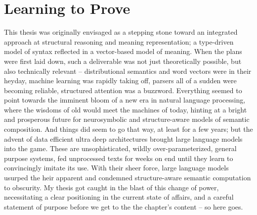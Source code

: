 \chapter{Learning to Prove}
\label{chapter:chapter_4}



This thesis was originally envisaged as a stepping stone toward an integrated approach at structural reasoning and meaning representation; a type-driven model of syntax reflected in a vector-based model of meaning.
When the plans were first laid down, such a deliverable was not just theoretically possible, but also technically relevant -- distributional semantics and word vectors were in their heyday, machine learning was rapidly taking off, parsers all of a sudden were becoming reliable, structured attention was a buzzword.
Everything seemed to point towards the imminent bloom of a new era in natural language processing, where the wisdoms of old would meet the machines of today, hinting at a bright and prosperous future for neurosymbolic and structure-aware models of semantic composition.
And things did seem to go that way, at least for a few years;
but the advent of data efficient ultra deep architectures brought large language models into the game.
These are unsophisticated, wildly over-parameterized, general purpose systems, fed unprocessed texts for weeks on end until they learn to convincingly imitate its use.
With their sheer force,
large language models usurped the heir apparent and condemned structure-aware semantic computation to obscurity.
My thesis got caught in the blast of this change of power, necessitating a clear positioning in the current state of affairs, and a careful statement of purpose before we get to the the chapter's content -- so here goes.

